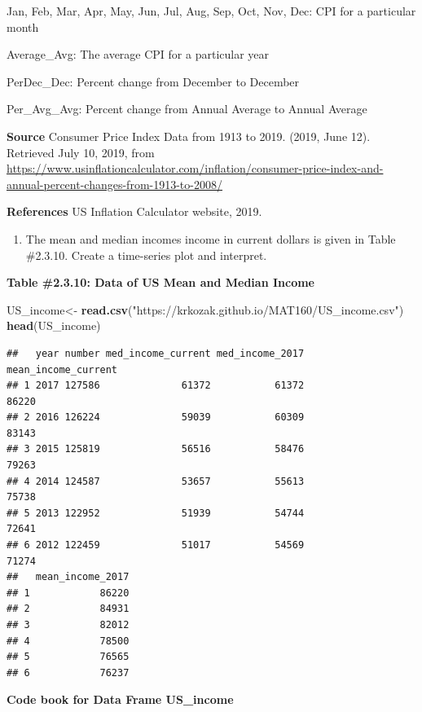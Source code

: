 \documentclass[
]{book}
\newenvironment{Shaded}{\begin{snugshade}}{\end{snugshade}}
\newcommand{\KeywordTok}[1]{\textcolor[rgb]{0.13,0.29,0.53}{\textbf{#1}}}
\newcommand{\NormalTok}[1]{#1}
\newcommand{\StringTok}[1]{\textcolor[rgb]{0.31,0.60,0.02}{#1}}
\providecommand{\tightlist}{%
  \setlength{\itemsep}{0pt}\setlength{\parskip}{0pt}}
\begin{document}
Jan, Feb, Mar, Apr, May, Jun, Jul, Aug, Sep, Oct, Nov, Dec: CPI for a particular month

Average\_Avg: The average CPI for a particular year

PerDec\_Dec: Percent change from December to December

Per\_Avg\_Avg: Percent change from Annual Average to Annual Average

\textbf{Source}
Consumer Price Index Data from 1913 to 2019. (2019, June 12). Retrieved July 10, 2019, from \url{https://www.usinflationcalculator.com/inflation/consumer-price-index-and-annual-percent-changes-from-1913-to-2008/}

\textbf{References}
US Inflation Calculator website, 2019.

\begin{enumerate}
\def\labelenumi{\arabic{enumi}.}
\setcounter{enumi}{7}
\tightlist
\item
  The mean and median incomes income in current dollars is given in Table \#2.3.10. Create a time-series plot and interpret.
\end{enumerate}

\textbf{Table \#2.3.10: Data of US Mean and Median Income}

\begin{Shaded}
\begin{Highlighting}[]
\NormalTok{US_income<-}\StringTok{ }\KeywordTok{read.csv}\NormalTok{(}\StringTok{"https://krkozak.github.io/MAT160/US_income.csv"}\NormalTok{)}
\KeywordTok{head}\NormalTok{(US_income)}
\end{Highlighting}
\end{Shaded}

\begin{verbatim}
##   year number med_income_current med_income_2017 mean_income_current
## 1 2017 127586              61372           61372               86220
## 2 2016 126224              59039           60309               83143
## 3 2015 125819              56516           58476               79263
## 4 2014 124587              53657           55613               75738
## 5 2013 122952              51939           54744               72641
## 6 2012 122459              51017           54569               71274
##   mean_income_2017
## 1            86220
## 2            84931
## 3            82012
## 4            78500
## 5            76565
## 6            76237
\end{verbatim}

\textbf{Code book for Data Frame US\_income}
\end{document}
